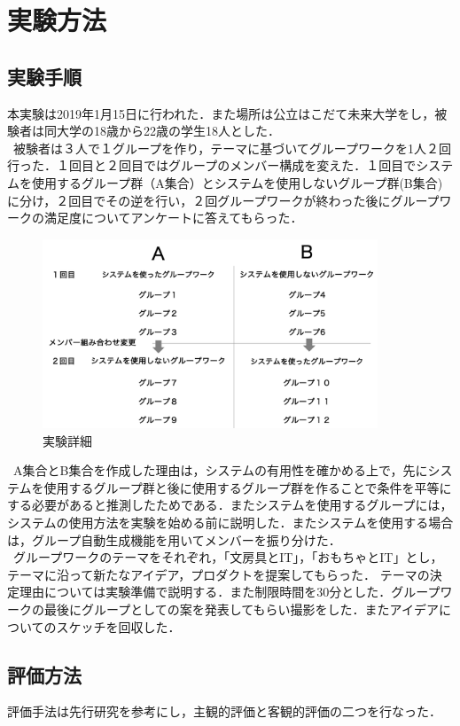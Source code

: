 \documentclass{funthesis}
\begin{document}
\section{実験方法}
\subsection{実験手順}
本実験は2019年1月15日に行われた．また場所は公立はこだて未来大学をし，被験者は同大学の18歳から22歳の学生18人とした．\\
\ 被験者は３人で１グループを作り，テーマに基づいてグループワークを1人２回行った．１回目と２回目ではグループのメンバー構成を変えた．１回目でシステムを使用するグループ群（A集合）とシステムを使用しないグループ群(B集合)に分け，２回目でその逆を行い，２回グループワークが終わった後にグループワークの満足度についてアンケートに答えてもらった．

\begin{figure}[h]
 \centering
   \includegraphics[width=100mm]{figures/zikken1.png}
 \caption{実験詳細}
 \label{zikken1}
\end{figure}

\ A集合とB集合を作成した理由は，システムの有用性を確かめる上で，先にシステムを使用するグループ群と後に使用するグループ群を作ることで条件を平等にする必要があると推測したためである．またシステムを使用するグループには，システムの使用方法を実験を始める前に説明した．またシステムを使用する場合は，グループ自動生成機能を用いてメンバーを振り分けた．\\
\ グループワークのテーマをそれぞれ，「文房具とIT」，「おもちゃとIT」とし，テーマに沿って新たなアイデア，プロダクトを提案してもらった．
テーマの決定理由については実験準備で説明する．また制限時間を30分とした．グループワークの最後にグループとしての案を発表してもらい撮影をした．またアイデアについてのスケッチを回収した．

\subsection{評価方法}
評価手法は先行研究\cite{A17}を参考にし，主観的評価と客観的評価の二つを行なった．
\end{document}
